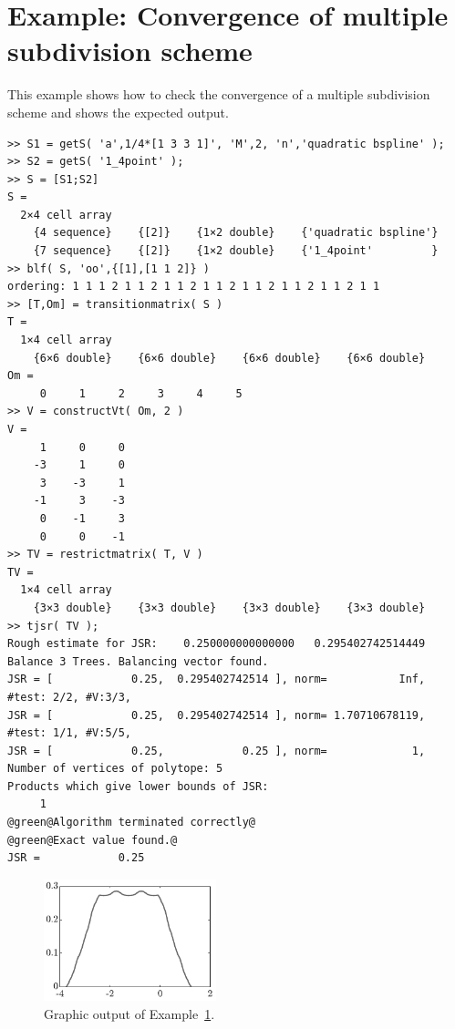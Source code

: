 \section{Example: Convergence of multiple subdivision scheme}\label{sec_ex_mss}
This example shows how to check the convergence of a multiple subdivision scheme
and shows the expected output.
\begin{lstlisting}
>> S1 = getS( 'a',1/4*[1 3 3 1]', 'M',2, 'n','quadratic bspline' );
>> S2 = getS( '1_4point' );
>> S = [S1;S2]
S =
  2×4 cell array
    {4 sequence}    {[2]}    {1×2 double}    {'quadratic bspline'}
    {7 sequence}    {[2]}    {1×2 double}    {'1_4point'         }
>> blf( S, 'oo',{[1],[1 1 2]} )
ordering: 1 1 1 2 1 1 2 1 1 2 1 1 2 1 1 2 1 1 2 1 1 2 1 1
>> [T,Om] = transitionmatrix( S )
T =
  1×4 cell array
    {6×6 double}    {6×6 double}    {6×6 double}    {6×6 double}
Om =
     0     1     2     3     4     5
>> V = constructVt( Om, 2 )
V =
     1     0     0
    -3     1     0
     3    -3     1
    -1     3    -3
     0    -1     3
     0     0    -1
>> TV = restrictmatrix( T, V )
TV =
  1×4 cell array
    {3×3 double}    {3×3 double}    {3×3 double}    {3×3 double}
>> tjsr( TV );
Rough estimate for JSR:    0.250000000000000   0.295402742514449
Balance 3 Trees. Balancing vector found.
JSR = [            0.25,  0.295402742514 ], norm=           Inf, #test: 2/2, #V:3/3, 
JSR = [            0.25,  0.295402742514 ], norm= 1.70710678119, #test: 1/1, #V:5/5, 
JSR = [            0.25,            0.25 ], norm=             1, 
Number of vertices of polytope: 5
Products which give lower bounds of JSR: 
     1
@green@Algorithm terminated correctly@
@green@Exact value found.@
JSR =            0.25
\end{lstlisting}
\begin{figure}[tb]\centering
    \includegraphics[width=5cm,keepaspectratio]{./graphics/blf}
    \caption{Graphic output of Example~\ref{sec_ex_mss}.}
\end{figure}

